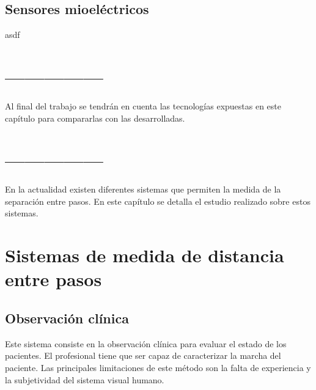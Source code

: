 \subsection{Sensores mioeléctricos}
\label{sec:mioelectricos2}
asdf


\section{---------------}

Al final del trabajo se tendrán en cuenta las  tecnologías expuestas en este capítulo para compararlas con las desarrolladas.
\cite{citaPruebaMiri}

\section{---------------}

En la actualidad existen diferentes sistemas que permiten la medida de la separación entre pasos. En este capítulo se detalla el estudio realizado sobre estos sistemas.

\section{Sistemas de medida de distancia entre pasos}
	\subsection{Observación clínica}
	Este sistema consiste en la observación clínica para evaluar el estado de los pacientes. El profesional tiene que ser capaz de caracterizar la marcha del paciente. Las principales limitaciones de este método son la falta de experiencia y la subjetividad del sistema visual humano. 
	
	
